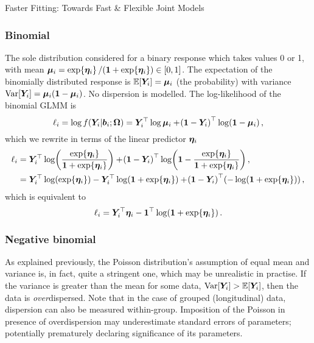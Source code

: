 \begin{chapter}{\label{cha:flexible}Faster Fitting: Towards Fast \& Flexible Joint Models}
\subsubsection*{Binomial}
The sole distribution considered for a binary response which takes values 0 or 1, with mean $\bm{\mu}_i=\exp\!\left\{\bm{\eta}_i\right\}/\!\left(\bm{1}+\exp\!\left\{\bm{\eta}_i\right\}\right)\in[0,1]$. The expectation of the binomially distributed response is $\operatorname{\mathbb{E}}\!\left[\bm{Y}_i\right]=\bm{\mu}_i$ (\ie the probability) with variance $\mathrm{Var}\!\left[\bm{Y}_i\right]=\bm{\mu}_i\!\left(\bm{1}-\bm{\mu}_i\right)$. No dispersion is modelled. The log-likelihood of the binomial GLMM is 
\begin{equation*}
    \ell_i=\log f\!\left(\bm{Y}_i|\bm{b}_i;\bm{\mathrm{\Omega}}\right) = \bm{Y}_i^\top\log\bm{\mu}_i+\!\left(\bm{1}-\bm{Y}_i\right)^\top\log\!\left(\bm{1}-\bm{\mu}_i\right),
\end{equation*}
which we rewrite in terms of the linear predictor $\bm{\eta}_i$
\begin{align*}
    \ell_i&=\Y^\top\log\lb\frac{\exp\lbr\linp\rbr}{\bone+\exp\lbr\linp\rbr}\rb+\lb\bone-\Y\rb^\top\log\lb\bone-\frac{\exp\lbr\linp\rbr}{\bone+\exp\lbr\linp\rbr}\rb,\\
    &=\Y^\top\log\lb\exp\lbr\linp\rbr\rb-\Y^\top\log\lb\bone+\exp\lbr\linp\rbr\rb+\lb\bone-\Y\rb^\top\lb-\log\lb\bone+\exp\lbr\linp\rbr\rb\rb,
\end{align*}
which is equivalent to 
\begin{equation}
    \ell_i=\bm{Y}_i^\top\bm{\eta}_i-\bm{1}^\top\log\!\left(\bm{1}+\exp\!\left\{\bm{\eta}_i\right\}\right).
\label{eq:flexible-binomial-ll}
\end{equation}

\subsubsection*{Negative binomial}
As explained previously, the Poisson distribution's assumption of equal mean and variance is, in fact, quite a stringent one, which may be unrealistic in practise. If the variance is greater than the mean for some data, $\mathrm{Var}\!\left[\bm{Y}_i\right]>\operatorname{\mathbb{E}}\!\left[\bm{Y}_i\right]$, then the data is \textit{over}dispersed. Note that in the case of grouped (\eg longitudinal) data, dispersion can also be measured within-group. Imposition of the Poisson in presence of overdispersion may underestimate standard errors of parameters; potentially prematurely declaring significance of its parameters. 


\end{chapter}
